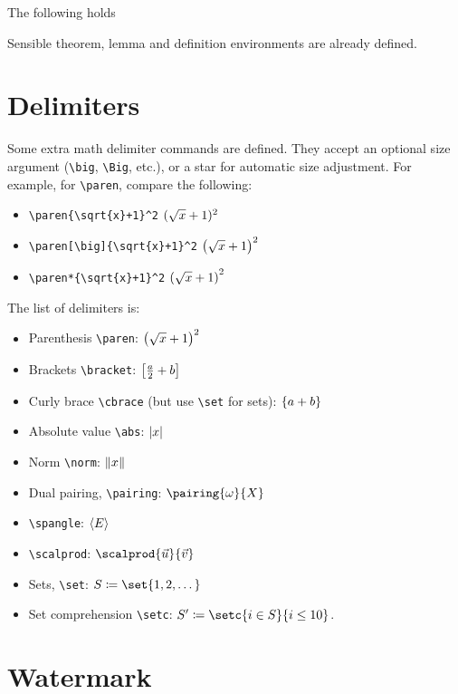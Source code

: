 \documentclass{scrartcl}
\begin{document}
The following holds
\begin{theorem}
Sensible theorem, lemma and definition environments are already defined.
\end{theorem}

\section{Delimiters}

Some extra math delimiter commands are defined.
They accept an optional size argument (\lstinline|\big|, \lstinline|\Big|, etc.), or a star for automatic size adjustment.
For example, for \lstinline|\paren|, compare the following:
\begin{itemize}
\item \lstinline|\paren{\sqrt{x}+1}^2| \(\paren{\sqrt{x}+1}^2\)
\item \lstinline|\paren[\big]{\sqrt{x}+1}^2| \(\paren[\big]{\sqrt{x}+1}^2\)
\item \lstinline|\paren*{\sqrt{x}+1}^2| \(\paren*{\sqrt{x}+1}^2\)
\end{itemize}

The list of delimiters is:

\begin{itemize}
\item Parenthesis \lstinline|\paren|: \(\paren[\big]{\sqrt{x} + 1}^2\)
  \item Brackets \lstinline|\bracket|: \(\bracket[\big]{\frac{a}{2}+b}\)
\item Curly brace \lstinline|\cbrace| (but use \lstinline|\set| for sets): \(\cbrace{a+b}\)
\item Absolute value \lstinline|\abs|: \(\abs{x}\)
\item Norm \lstinline|\norm|: \(\norm{x}\)
\item Dual pairing, \lstinline|\pairing|: \(\pairing{\omega}{X}\)
  \item \lstinline|\spangle|: \(\spangle{E}\)
\item \lstinline|\scalprod|: \(\scalprod{\vec{u}}{\vec{v}}\)
\item Sets, \lstinline|\set|: \(S \coloneqq \set{1,2,\dotsc}\)
  \item Set comprehension \lstinline|\setc|: \(S' \coloneqq \setc{i \in S}{i \leq 10}\).
\end{itemize}

\section{Watermark}
\end{document}
